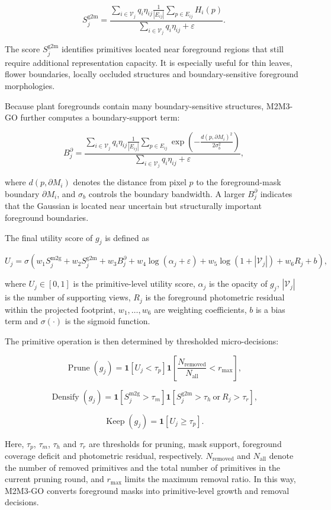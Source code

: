 \documentclass[a4paper]{cas-sc}
\begin{document}
\[
S^{\text{g2m}}_j=
\frac{
\sum_{i\in \mathcal{V}_j} q_i \eta_{ij}
\frac{1}{|E_{ij}|}\sum_{p\in E_{ij}} H_i(p)
}{
\sum_{i\in \mathcal{V}_j} q_i \eta_{ij}+\varepsilon
}.
\]

The score \(S^{\text{g2m}}_j\) identifies primitives located near foreground regions that still require additional representation capacity. It is especially useful for thin leaves, flower boundaries, locally occluded structures and boundary-sensitive foreground morphologies.

Because plant foregrounds contain many boundary-sensitive structures, M2M3-GO further computes a boundary-support term:

\[
B^{\partial}_j=
\frac{
\sum_{i\in \mathcal{V}_j} q_i \eta_{ij}
\frac{1}{|E_{ij}|}\sum_{p\in E_{ij}}
\exp\left(-\frac{d(p,\partial M_i)^2}{2\sigma_b^2}\right)
}{
\sum_{i\in \mathcal{V}_j} q_i \eta_{ij}+\varepsilon
},
\]

where \(d(p,\partial M_i)\) denotes the distance from pixel \(p\) to the foreground-mask boundary \(\partial M_i\), and \(\sigma_b\) controls the boundary bandwidth. A larger \(B^{\partial}_j\) indicates that the Gaussian is located near uncertain but structurally important foreground boundaries.

The final utility score of \(g_j\) is defined as

\[
U_j=
\sigma\left(
w_1 S^{\text{m2g}}_j
+w_2 S^{\text{g2m}}_j
+w_3 B^{\partial}_j
+w_4 \log(\alpha_j+\varepsilon)
+w_5 \log(1+|\mathcal{V}_j|)
+w_6 R_j
+b
\right),
\]

where \(U_j\in[0,1]\) is the primitive-level utility score, \(\alpha_j\) is the opacity of \(g_j\), \(|\mathcal{V}_j|\) is the number of supporting views, \(R_j\) is the foreground photometric residual within the projected footprint, \(w_1,\ldots,w_6\) are weighting coefficients, \(b\) is a bias term and \(\sigma(\cdot)\) is the sigmoid function.

The primitive operation is then determined by thresholded micro-decisions:

\[
\operatorname{Prune}(g_j)=
\mathbf{1}\left[U_j<\tau_p\right]
\mathbf{1}\left[\frac{N_{\text{removed}}}{N_{\text{all}}}<r_{\max}\right],
\]

\[
\operatorname{Densify}(g_j)=
\mathbf{1}\left[S^{\text{m2g}}_j>\tau_m\right]
\mathbf{1}\left[S^{\text{g2m}}_j>\tau_h \ \text{or}\ R_j>\tau_r\right],
\]

\[
\operatorname{Keep}(g_j)=
\mathbf{1}\left[U_j\geq \tau_p\right].
\]

Here, \(\tau_p\), \(\tau_m\), \(\tau_h\) and \(\tau_r\) are thresholds for pruning, mask support, foreground coverage deficit and photometric residual, respectively. \(N_{\text{removed}}\) and \(N_{\text{all}}\) denote the number of removed primitives and the total number of primitives in the current pruning round, and \(r_{\max}\) limits the maximum removal ratio. In this way, M2M3-GO converts foreground masks into primitive-level growth and removal decisions.
\end{document}
